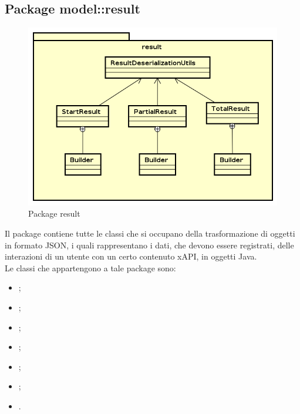 \documentclass[../Tesi.tex]{subfiles}
\begin{document}
	\subsection{Package model::result}
		\begin{figure}[H]
			\centering
			\includegraphics[scale=0.6]{images/package_diagrams/result}
				\caption{Package result}
		\end{figure}
		Il package  contiene tutte le classi che si occupano della trasformazione di oggetti in formato JSON, i quali rappresentano i dati, che devono essere registrati, delle interazioni di un utente con un certo contenuto xAPI, in oggetti Java. \\
		Le classi che appartengono a tale package sono:
		\begin{itemize}
			\item {};
			\item {};
			\item {};
			\item {};
			\item {};
			\item {};
			\item {}.
		\end{itemize}
\end{document}
